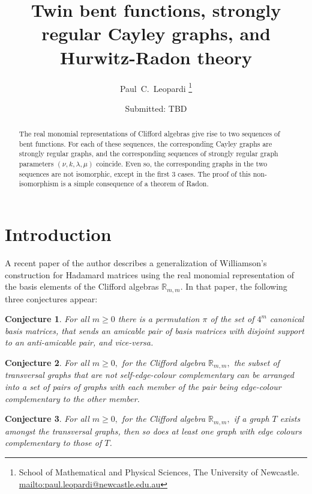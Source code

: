 \documentclass[12pt,a4paper]{article}
\title{Twin bent functions, strongly regular Cayley graphs, and Hurwitz-Radon theory}
\author{
Paul~C.~Leopardi
\thanks{School of Mathematical and Physical Sciences, The University of Newcastle.
\protect\url{mailto:paul.leopardi@newcastle.edu.au}}
}
\date{Submitted: TBD}
\newcommand{\mb}[1]{\mathbb{#1}}
\newcommand{\R}{\mb{R}}
\newtheorem{Conjecture}{Conjecture}
\begin{document}
\maketitle

\begin{abstract}
%
The real monomial representations of Clifford algebras
give rise to two sequences of bent functions.
For each of these sequences, the corresponding Cayley graphs are 
strongly regular graphs, and the corresponding sequences of strongly regular graph parameters
$(\nu,k,\lambda,\mu)$ coincide.
Even so, the corresponding graphs in the two sequences are not isomorphic, except in the first 3 cases.
The proof of this non-isomorphism is a simple consequence of a theorem of Radon.  
%
\end{abstract}

\section{Introduction}
\label{sec-Introduction}

A recent paper of the author \cite{Leo14Constructions} describes a generalization of
Williamson's construction for Hada\-mard matrices \cite{Wil44}
using the real monomial representation of the basis elements of the Clifford algebras $\R_{m,m}$.
In that paper, the following three conjectures appear:

\begin{Conjecture}\label{conjecture-1}
%
For all $m \geqslant 0$ there is a permutation $\pi$ of the set of $4^m$ canonical basis matrices,
that sends an amicable pair of basis matrices with disjoint support to an anti-amicable pair, and vice-versa.
%
\end{Conjecture}

\begin{Conjecture}\label{conjecture-2}
%
For all $m \geqslant 0,$ 
for the Clifford algebra $\R_{m,m},$ the subset of transversal graphs that are 
not self-edge-colour complementary
can be arranged into a set of pairs of graphs with each member of the pair 
being edge-colour complementary to the other member.
%
\end{Conjecture}

\begin{Conjecture}\label{conjecture-3}
%
For all $m \geqslant 0,$ 
for the Clifford algebra $\R_{m,m},$ if a graph $T$ exists amongst the transversal graphs,
then so does at least one graph with edge colours complementary to those of $T$.
%
\end{Conjecture}
\end{document}
